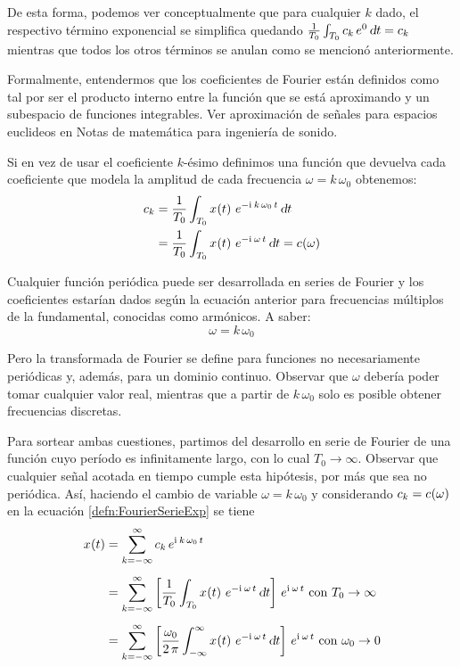 \documentclass[a5paper,12pt,twoside]{book}
\begin{document}
De esta forma, podemos ver conceptualmente que para cualquier $k$ dado, el respectivo término exponencial se simplifica quedando $\frac{1}{T_0} \int_{T_0} c_k \, e^0 \, \dif t = c_k$ mientras que todos los otros términos se anulan como se mencionó anteriormente.

Formalmente, entendermos que los coeficientes de Fourier están definidos como tal por ser el producto interno entre la función que se está aproximando y un subespacio de funciones integrables. Ver aproximación de señales para espacios euclideos en Notas de matemática para ingeniería de sonido.

Si en vez de usar el coeficiente $k$-ésimo definimos una función que devuelva cada coeficiente que modela la amplitud de cada frecuencia $\omega = k \, \omega_0$ obtenemos:
\begin{align*}
    c_\kth &= \frac{1}{T_0} \int_{T_0} \fx[x]{t} \, e^{-\iu \, \kth \, \omega_0 \, t} \, \dif t
    \\
    &= \frac{1}{T_0} \int_{T_0} \fx[x]{t} \, e^{-\iu \, \omega \, t} \, \dif t = \fx[c]{\omega}
\end{align*}

Cualquier función periódica puede ser desarrollada en series de Fourier y los coeficientes estarían dados según la ecuación anterior para frecuencias múltiplos de la fundamental, conocidas como armónicos. A saber:
\begin{equation*}
    \omega = k \, \omega_0
\end{equation*}

Pero la transformada de Fourier se define para funciones no necesariamente periódicas y, además, para un dominio continuo. Observar que $\omega$ debería poder tomar cualquier valor real, mientras que a partir de $k \, \omega_0$ solo es posible obtener frecuencias discretas.

Para sortear ambas cuestiones, partimos del desarrollo en serie de Fourier de una función cuyo período es infinitamente largo, con lo cual $T_0 \to \infty$. Observar que cualquier señal acotada en tiempo cumple esta hipótesis, por más que sea no periódica.
Así, haciendo el cambio de variable $\omega = k \, \omega_0$ y considerando $c_k = \fx[c]{\omega}$ en la ecuación \ref{defn:FourierSerieExp} se tiene
\begin{align*}
    \fx[x]{t} &= \sum_{\kth=-\infty}^\infty c_\kth \, e^{\iu \, \kth \, \omega_0 \, t}
    \\[1ex]
    &= \sum_{\kth=-\infty}^\infty \left[ \frac{1}{T_0} \int_{T_0} \fx[x]{t} \, e^{-\iu \, \omega \, t} \, \dif t \right] \, e^{\iu \, \omega \, t} \text{ con } T_0 \to \infty
    \\[1ex]
    &= \sum_{\kth=-\infty}^\infty \left[ \frac{\omega_0}{2 \, \pi} \int_{-\infty}^{\infty} \fx[x]{t} \, e^{-\iu \, \omega \, t} \, \dif t \right] \, e^{\iu \, \omega \, t} \text{ con } \omega_0 \to 0
\end{align*}
\end{document}
